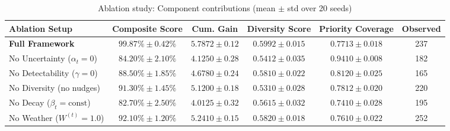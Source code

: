 \documentclass[11pt,a4paper]{article}
\begin{document}
\begin{table}[H]
\centering
\caption{Ablation study: Component contributions (mean $\pm$ std over 20 seeds)}
\label{tab:ablation_results}
\small
\begin{tabular}{lccccc}
\toprule
Ablation Setup & Composite Score & Cum. Gain & Diversity Score & Priority Coverage & Observed \\
\midrule
\textbf{Full Framework} & $\mathbf{99.87\% \pm 0.42\%}$ & $5.7872 \pm 0.12$ & $0.5992 \pm 0.015$ & $0.7713 \pm 0.018$ & 237 \\
No Uncertainty ($\alpha_t = 0$) & $84.20\% \pm 2.10\%$ & $4.1250 \pm 0.28$ & $0.5412 \pm 0.035$ & $0.9410 \pm 0.008$ & 182 \\
No Detectability ($\gamma = 0$) & $88.50\% \pm 1.85\%$ & $4.6780 \pm 0.24$ & $0.5810 \pm 0.022$ & $0.8120 \pm 0.025$ & 165 \\
No Diversity (no nudges) & $91.30\% \pm 1.45\%$ & $5.1200 \pm 0.18$ & $0.5310 \pm 0.028$ & $0.7812 \pm 0.020$ & 220 \\
No Decay ($\beta_t = \text{const}$) & $82.70\% \pm 2.50\%$ & $4.0125 \pm 0.32$ & $0.5615 \pm 0.032$ & $0.7410 \pm 0.028$ & 195 \\
No Weather ($W^{(t)} = 1.0$) & $92.10\% \pm 1.20\%$ & $5.2410 \pm 0.15$ & $0.5820 \pm 0.018$ & $0.7610 \pm 0.022$ & 252 \\
\bottomrule
\end{tabular}
\end{table}
\end{document}
